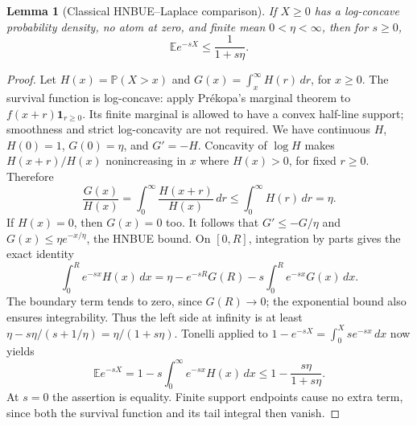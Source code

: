 \documentclass[11pt]{article}
\newtheorem{lemma}[theorem]{Lemma}
\theoremstyle{remark}\newtheorem{remark}[theorem]{Remark}
\newcommand{\E}{\mathbb E}
\newcommand{\Prob}{\mathbb P}
\numberwithin{equation}{section}
\begin{document}
\begin{lemma}[Classical HNBUE--Laplace comparison]\label{lem:HNBUE}
If $X\ge0$ has a log-concave probability density, no atom at zero, and
finite mean $0<\eta<\infty$, then for $s\ge0$,
\begin{equation}\label{eq:HNBUE}
 \E e^{-sX}\le\frac1{1+s\eta}.
\end{equation}
\end{lemma}
\begin{proof}
Let $H(x)=\Prob(X>x)$ and $G(x)=\int_x^\infty H(r)\,dr$, for $x\ge0$.
The survival function is log-concave: apply Pr\'ekopa's marginal theorem
to $f(x+r)\mathbf1_{r\ge0}$. Its finite marginal is allowed to have a
convex half-line support; smoothness and strict log-concavity are not
required. We have continuous $H$, $H(0)=1$, $G(0)=\eta$, and $G'=-H$.
Concavity of $\log H$ makes $H(x+r)/H(x)$ nonincreasing in $x$
where $H(x)>0$, for fixed $r\ge0$. Therefore
\[
 \frac{G(x)}{H(x)}=\int_0^\infty\frac{H(x+r)}{H(x)}\,dr
 \le\int_0^\infty H(r)\,dr=\eta.
\]
If $H(x)=0$, then $G(x)=0$ too. It follows that
$G'\le-G/\eta$ and $G(x)\le\eta e^{-x/\eta}$, the HNBUE bound.
On $[0,R]$, integration by parts gives the exact identity
\[
 \int_0^R e^{-sx}H(x)\,dx
 =\eta-e^{-sR}G(R)-s\int_0^R e^{-sx}G(x)\,dx.
\]
The boundary term tends to zero, since $G(R)\to0$; the exponential
bound also ensures integrability. Thus the left side at infinity is
at least $\eta-s\eta/(s+1/\eta)=\eta/(1+s\eta)$.
Tonelli applied to $1-e^{-sX}=\int_0^X se^{-sx}\,dx$ now yields
\[
 \E e^{-sX}=1-s\int_0^\infty e^{-sx}H(x)\,dx
 \le1-\frac{s\eta}{1+s\eta}.
\]
At $s=0$ the assertion is equality. Finite support endpoints cause no
extra term, since both the survival function and its tail integral
then vanish.
\end{proof}
\end{document}

